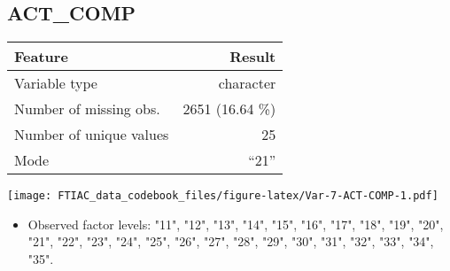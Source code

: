 \documentclass[]{article}
\providecommand{\tightlist}{%
  \setlength{\itemsep}{0pt}\setlength{\parskip}{0pt}}
\newcommand{\fullline}{\noindent\makebox[\linewidth]{\rule{\textwidth}{0.4pt}}}
\newcommand{\bminione}{\begin{minipage}{0.75 \textwidth}}
\newcommand{\bminitwo}{\begin{minipage}{0.25 \textwidth}}
\newcommand{\emini}{\end{minipage}}
\begin{document}
\fullline

\hypertarget{act_comp}{\subsection{ACT\_COMP}\label{act_comp}}

\bminione

\begin{longtable}[]{@{}lr@{}}
\toprule
\begin{minipage}[b]{0.34\columnwidth}\raggedright\strut
Feature\strut
\end{minipage} & \begin{minipage}[b]{0.21\columnwidth}\raggedleft\strut
Result\strut
\end{minipage}\tabularnewline
\midrule
\endhead
\begin{minipage}[t]{0.34\columnwidth}\raggedright\strut
Variable type\strut
\end{minipage} & \begin{minipage}[t]{0.21\columnwidth}\raggedleft\strut
character\strut
\end{minipage}\tabularnewline
\begin{minipage}[t]{0.34\columnwidth}\raggedright\strut
Number of missing obs.\strut
\end{minipage} & \begin{minipage}[t]{0.21\columnwidth}\raggedleft\strut
2651 (16.64 \%)\strut
\end{minipage}\tabularnewline
\begin{minipage}[t]{0.34\columnwidth}\raggedright\strut
Number of unique values\strut
\end{minipage} & \begin{minipage}[t]{0.21\columnwidth}\raggedleft\strut
25\strut
\end{minipage}\tabularnewline
\begin{minipage}[t]{0.34\columnwidth}\raggedright\strut
Mode\strut
\end{minipage} & \begin{minipage}[t]{0.21\columnwidth}\raggedleft\strut
``21''\strut
\end{minipage}\tabularnewline
\bottomrule
\end{longtable}

\emini
\bminitwo
\texttt{[image: FTIAC\_data\_codebook\_files/figure-latex/Var-7-ACT-COMP-1.pdf]}
\emini

\begin{itemize}
\tightlist
\item
  Observed factor levels: "11", "12", "13", "14", "15", "16", "17",
  "18", "19", "20", "21", "22", "23", "24", "25", "26", "27", "28",
  "29", "30", "31", "32", "33", "34", "35".
\end{itemize}
\end{document}
